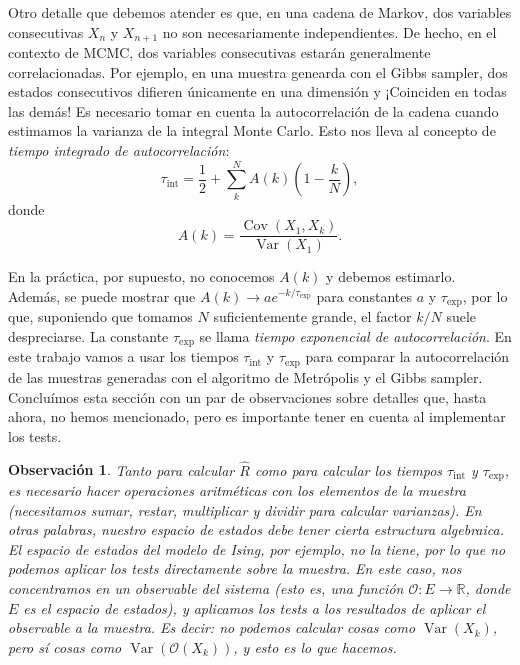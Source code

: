 \documentclass[a4paper, 12pt]{article}
\newtheorem*{observacion}{Observación}
\newcommand{\R}{\mathbb{R}}
\newcommand{\tauint}{\tau_\text{int}}
\newcommand{\tauexp}{\tau_\text{exp}}
\newcommand{\var}{\operatorname{Var}}
\newcommand{\cov}{\operatorname{Cov}}
\begin{document}
Otro detalle que debemos atender es que, en una cadena de Markov, dos variables consecutivas $X_n$ y $X_{n + 1}$ no son necesariamente independientes. De hecho, en el contexto de MCMC, dos variables consecutivas estarán generalmente correlacionadas. Por ejemplo, en una muestra genearda con el Gibbs sampler, dos estados consecutivos difieren únicamente en una dimensión y ¡Coinciden en todas las demás! Es necesario tomar en cuenta la autocorrelación de la cadena cuando estimamos la varianza de la integral Monte Carlo. Esto nos lleva al concepto de {\it tiempo integrado de autocorrelación}:
\begin{equation*}
    \tauint = \dfrac{1}{2} + \sum_k^N A(k) \left(1 - \frac{k}{N} \right),
\end{equation*} 
donde
\begin{equation*}
    A(k) = \dfrac{\cov (X_1, X_k)}{\var (X_1)}.
\end{equation*}

En la práctica, por supuesto, no conocemos $A(k)$ y debemos estimarlo. Además, se puede mostrar que $A(k) \to ae^{-k/\tauexp}$ para constantes $a$ y $\tauexp$, por lo que, suponiendo que tomamos $N$ suficientemente grande, el factor $k/N$ suele despreciarse. La constante $\tauexp$ se llama {\it tiempo exponencial de autocorrelación}. En este trabajo vamos a usar los tiempos $\tauint$ y $\tauexp$ para comparar la autocorrelación de las muestras generadas con el algoritmo de Metrópolis y el Gibbs sampler.\\

Concluímos esta sección con un par de observaciones sobre detalles que, hasta ahora, no hemos mencionado, pero es importante tener en cuenta al implementar los tests. 

\begin{observacion}
    Tanto para calcular $\hat{R}$ como para calcular los tiempos $\tauint$ y $\tauexp$, es necesario hacer operaciones aritméticas con los elementos de la muestra (necesitamos sumar, restar, multiplicar y dividir para calcular varianzas). En otras palabras, nuestro espacio de estados debe tener cierta estructura algebraica. El espacio de estados del modelo de Ising, por ejemplo, no la tiene, por lo que no podemos aplicar los tests directamente sobre la muestra. En este caso, nos concentramos en un observable del sistema (esto es, una función $\mathcal{O} : E \to \R$, donde $E$ es el espacio de estados), y aplicamos los tests a los resultados de aplicar el observable a la muestra. Es decir: no podemos calcular cosas como $\var(X_k)$, pero sí cosas como $\var(\mathcal{O}(X_k))$, y esto es lo que hacemos.
\end{observacion}
\end{document}
